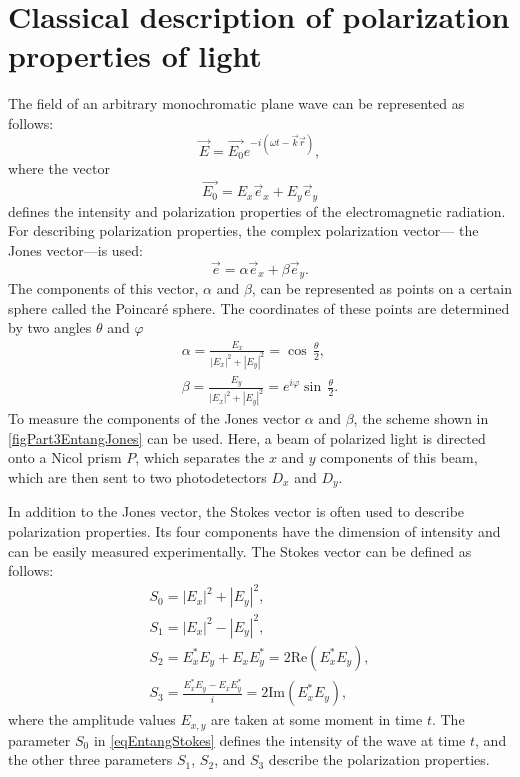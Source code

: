 \section{Classical description of polarization properties of light}
The field of an arbitrary monochromatic plane wave can be represented as
follows:
\begin{equation}
\vec{E} = \vec{E_0} e^{-i \left(\omega t - \vec{k}\vec{r}\right)},
\nonumber
\end{equation}
where the vector 
\[
\vec{E_0} = E_{x}\vec{e}_x + E_{y}\vec{e}_y
\]
defines the intensity and polarization properties of the electromagnetic
radiation. For describing polarization properties, the complex polarization vector— the Jones vector—is used:
\begin{equation}
\vec{e} = \alpha \vec{e}_x + \beta \vec{e}_y.
\label{eqEntangJones}
\end{equation}
The components of this vector, $\alpha$ and $\beta$, can be represented
as points on a certain sphere called the Poincaré sphere. The coordinates
of these points are determined by two angles $\theta$ and $\varphi$
\begin{eqnarray}
\alpha = \frac{E_x}{\left|E_x\right|^2 + \left|E_y\right|^2} = 
 \cos \, \frac{\theta}{2},
\nonumber \\
\beta = \frac{E_y}{\left|E_x\right|^2 + \left|E_y\right|^2} = 
 e^{i\varphi} \sin \, \frac{\theta}{2}.
\nonumber
\end{eqnarray}
To measure the components of the Jones vector $\alpha$ and $\beta$, the scheme shown in
\autoref{figPart3EntangJones} can be used. Here, a beam of polarized light
is directed onto a Nicol prism $P$, which separates the $x$ and $y$ components
of this beam, which are then sent to two photodetectors $D_x$ and $D_y$.



In addition to the Jones vector, the Stokes vector is often used to describe polarization properties. Its four components
have the dimension of intensity and can be easily measured
experimentally. The Stokes vector can be defined as follows:
\begin{eqnarray}
S_0 = \left|E_x\right|^2 + \left|E_y\right|^2,
\nonumber \\
S_1 = \left|E_x\right|^2 - \left|E_y\right|^2,
\nonumber \\
S_2 = E_x^{*} E_y + E_x E_y^{*} = 2 \mathrm{Re} \left(E_x^{*} E_y\right),
\nonumber \\
S_3 = \frac{E_x^{*} E_y - E_x E_y^{*}}{i} = 2 \mathrm{Im} \left(E_x^{*}
E_y\right),
\label{eqEntangStokes}
\end{eqnarray}
where the amplitude values $E_{x,y}$ are taken at some moment in time $t$. 
The parameter $S_0$ in \eqref{eqEntangStokes} defines the intensity of the wave
at time $t$,
and the other three parameters $S_1$, $S_2$, and $S_3$ describe the polarization
properties. 


